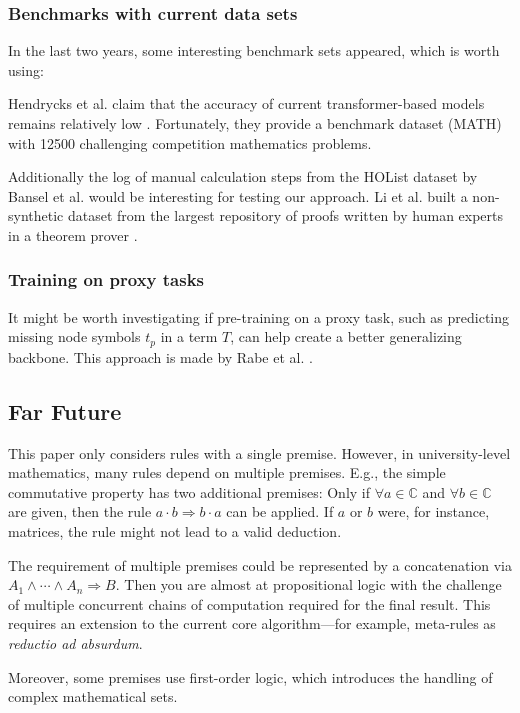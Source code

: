 \documentclass{scrartcl}
\theoremstyle{definition}
\begin{document}
\subsubsection{Benchmarks with current data sets}

In the last two years, some interesting benchmark sets appeared, which is worth using:

Hendrycks et al. claim that the accuracy of current transformer-based models remains relatively low \cite{hendrycks2021measuring}.
Fortunately, they provide a benchmark dataset (MATH) with 12500 challenging competition mathematics problems.

Additionally the log of manual calculation steps from the HOList dataset by Bansel et al. \cite{kaliszyk2017holstep} would be interesting for testing our approach.
Li et al. built a non-synthetic dataset from the largest repository of proofs written by human experts in a theorem prover \cite{li2021isarstep}.

\subsubsection{Training on proxy tasks}

It might be worth investigating if pre-training on a proxy task, such as predicting missing node symbols $t_p$ in a term $T$, can help create a better generalizing backbone.
This approach is made by Rabe et al. \cite{rabe2020mathematical}.

\subsection{Far Future}

This paper only considers rules with a single premise.
However, in university-level mathematics, many rules depend on multiple premises.
E.g., the simple commutative property has two additional premises: Only if $\forall a \in \mathbb{C}$ and $\forall b \in \mathbb{C}$ are given,
then the rule $a\cdot b \Longrightarrow b\cdot a$ can be applied. If $a$ or $b$ were, for instance, matrices, the rule might not lead to a valid deduction.

The requirement of multiple premises could be represented by a concatenation via $A_1 \wedge \cdots \wedge A_n \Longrightarrow B$.
Then you are almost at propositional logic with the challenge of multiple concurrent chains of computation required for the final result.
This requires an extension to the current core algorithm—for example, meta-rules as \textit{reductio ad absurdum}.

Moreover, some premises use first-order logic, which introduces the handling of complex mathematical sets.


\printbibliography
\end{document}

